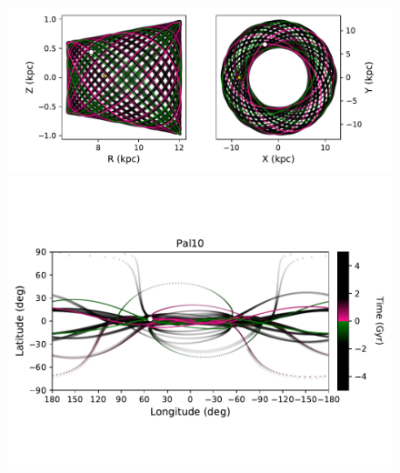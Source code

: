            \begin{figure}
                \begin{center}
                    \includegraphics[clip=true, trim = 0mm 2mm 0mm 0mm, width=\columnwidth]{images/PII_individual_Pal10_Pal10orbitRZXY.pdf}
                    \includegraphics[clip=true, trim = 0mm 20mm 0mm 10mm, width=\columnwidth]{images/PII_individual_Pal10_Pal10orbit.pdf}


\end{center}
\end{figure}
